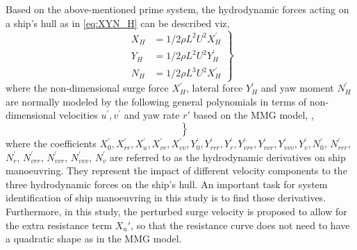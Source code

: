 \noindent Based on the above-mentioned prime system, the hydrodynamic forces acting on a ship's hull as in \autoref{eq:XYN_H} can be described viz,
\begin{equation}
    \label{eq:XYN_H}
    \left.\begin{aligned}
    X_H & = 1/2\rho L^{2} U^{2} X_H^{'}  \\
    Y_H & = 1/2\rho L^{2} U^{2} Y_H^{'}  \\
    N_H & = 1/2\rho L^{3} U^{2} X_H^{'}
    \end{aligned}\right\}
\end{equation}
where the non-dimensional surge force $X_H^{'}$, lateral force $Y_H^{'}$ and yaw moment $N_H^{'}$ are normally modeled by the following general polynomials in terms of non-dimensional velocities $u^{'}, v^{'}$ and yaw rate $r'$ based on the MMG model, \citep{yasukawaIntroductionMMGStandard2015},
\begin{equation}
    \label{eq:XYN_H_prime}
    \left.\begin{aligned}
     \\
     \\
    
    \end{aligned}\right\}
\end{equation}
where the coefficients $X_0^{'}, X_{rr}^{'}, X_u^{'}, X_{vr}^{'}, X_{vv}^{'}, Y_{0}^{'}, Y_{rrr}^{'}, Y_{r}^{'}, Y_{vrr}^{'}, Y_{vvr}^{'}, Y_{vvv}^{'}, Y_{v}^{'}, N_{0}^{'}$, $N_{rrr}^{'}$, $N_{r}^{'}$, $N_{vrr}^{'}$, $N_{vvr}^{'}$, $N_{vvv}^{'}$, $N_{v}^{'}$ are referred to as the hydrodynamic derivatives on ship manoeuvring. They represent the impact of different velocity components to the three hydrodynamic forces on the ship's hull. An important task for system identification of ship manoeuvring in this study is to find those derivatives. Furthermore, in this study, the perturbed surge velocity is proposed to allow for the extra resistance term ${X_u}'$, so that the resistance curve does not need to have a quadratic shape as in the MMG model.  
%
%     
%     
